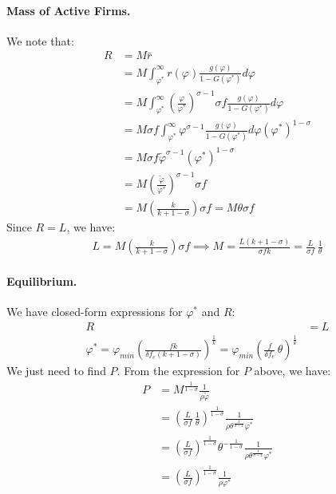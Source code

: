\begin{solution}
\paragraph{Mass of Active Firms.} We note that:
\begin{align*}
R &= M \bar{r} \\
&= M \int_{\varphi^*}^{\infty} r(\varphi) \frac{g(\varphi)}{1 - G(\varphi^*)} d\varphi \\
&= M \int_{\varphi^*}^{\infty} \left(\frac{\varphi}{\varphi^*}\right)^{\sigma - 1} \sigma f \frac{g(\varphi)}{1 - G(\varphi^*)} d\varphi \\
&= M \sigma f \int_{\varphi^*}^{\infty} \varphi^{\sigma - 1} \frac{g(\varphi)}{1 - G(\varphi^*)} d\varphi \left(\varphi^*\right)^{1 - \sigma} \\
&= M \sigma f \tilde{\varphi}^{\sigma - 1} \left(\varphi^*\right)^{1 - \sigma} \\
&= M \left(\frac{\tilde{\varphi}}{\varphi^*}\right)^{\sigma - 1} \sigma f \\
&= M \left( \frac{k}{k + 1 - \sigma} \right) \sigma f = M \theta \sigma f
\end{align*}
Since $R = L$, we have:
\begin{align*}
L = M \left( \frac{k}{k + 1 - \sigma} \right) \sigma f \implies M = \frac{L (k + 1 - \sigma)}{\sigma f k} = \frac{L}{\sigma f}\,\frac{1}{\theta}
\end{align*}

\paragraph{Equilibrium.} We have closed-form expressions for $\varphi^*$ and $R$:
\begin{align*}
    R &= L\\
    \varphi^* = \varphi_{min} \left(\frac{fk}{\delta f_e (k + 1 - \sigma)}\right)^{\frac{1}{k}} = \varphi_{min} \left( \frac{f}{\delta f_e}\, \theta \right)^{\frac{1}{k}}
\end{align*}
We just need to find $P$. From the expression for $P$ above, we have:
\begin{align*}
    P &= M^{\frac{1}{1 - \sigma}} \frac{1}{\rho \tilde{\varphi}} \\
    &= \left( \frac{L}{\sigma f}\,\frac{1}{\theta} \right)^{\frac{1}{1 - \sigma}} \frac{1}{\rho \theta^{\frac{1}{\sigma - 1}} \varphi^*} \\
    &= \left( \frac{L}{\sigma f} \right)^{\frac{1}{1 - \sigma}} \theta^{-\frac{1}{1 - \sigma}} \frac{1}{\rho \theta^{\frac{1}{\sigma - 1}} \varphi^*} \\
    &= \left( \frac{L}{\sigma f} \right)^{\frac{1}{1 - \sigma}} \frac{1}{\rho \varphi^*}
\end{align*}
\end{solution}